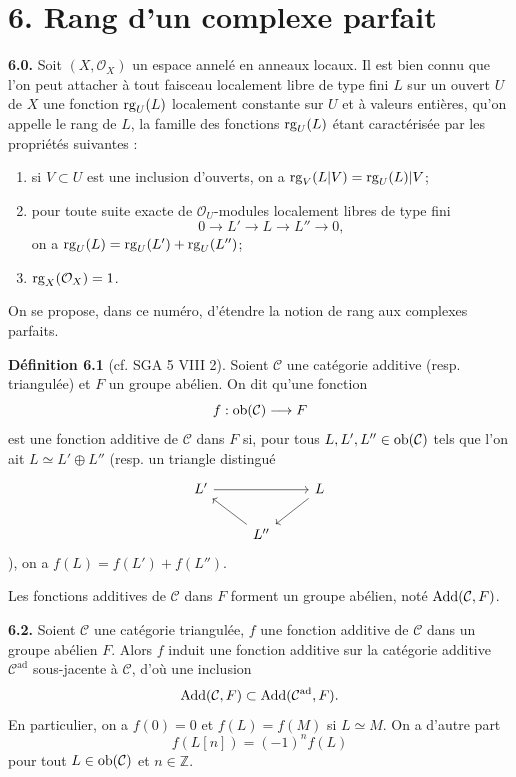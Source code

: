 \documentclass[11pt]{article}
\begin{document}
\section*{6. Rang d'un complexe parfait}

\textbf{6.0.} Soit \((X,\mathcal O_X)\) un espace annelé en anneaux locaux. Il est bien connu que l'on peut attacher à tout faisceau localement libre de type fini \(L\) sur un ouvert \(U\) de \(X\) une fonction \(\operatorname{rg}_U(L)\) localement constante sur \(U\) et à valeurs entières, qu'on appelle le rang de \(L\), la famille des fonctions \(\operatorname{rg}_U(L)\) étant caractérisée par les propriétés suivantes :
\begin{enumerate}[label=(\roman*)]
\item si \(V\subset U\) est une inclusion d'ouverts, on a \(\operatorname{rg}_V(L|V)=\operatorname{rg}_U(L)|V\);
\item pour toute suite exacte de \(\mathcal O_U\)-modules localement libres de type fini
\[
  0\longrightarrow L'\longrightarrow L\longrightarrow L''\longrightarrow 0,
\]
on a \(\operatorname{rg}_U(L)=\operatorname{rg}_U(L')+\operatorname{rg}_U(L'')\);
\item \(\operatorname{rg}_X(\mathcal O_X)=1\).
\end{enumerate}
On se propose, dans ce numéro, d'étendre la notion de rang aux complexes parfaits.

\textbf{Définition 6.1} (cf. SGA 5 VIII 2). Soient \(\mathcal C\) une catégorie additive (resp. triangulée) et \(F\) un groupe abélien. On dit qu'une fonction
\[
  f:\operatorname{ob}(\mathcal C)\longrightarrow F
\]
est une fonction additive de \(\mathcal C\) dans \(F\) si, pour tous \(L,L',L''\in\operatorname{ob}(\mathcal C)\) tels que l'on ait \(L\simeq L'\oplus L''\) (resp. un triangle distingué
\[
\begin{tikzcd}
L' \arrow[rr] && L \arrow[dl]\\
& L'' \arrow[ul] &
\end{tikzcd}
\]
), on a \(f(L)=f(L')+f(L'')\).

Les fonctions additives de \(\mathcal C\) dans \(F\) forment un groupe abélien, noté \(\operatorname{Add}(\mathcal C,F)\).

\textbf{6.2.} Soient \(\mathcal C\) une catégorie triangulée, \(f\) une fonction additive de \(\mathcal C\) dans un groupe abélien \(F\). Alors \(f\) induit une fonction additive sur la catégorie additive \(\mathcal C^{\mathrm{ad}}\) sous-jacente à \(\mathcal C\), d'où une inclusion
\[
  \operatorname{Add}(\mathcal C,F)\subset \operatorname{Add}(\mathcal C^{\mathrm{ad}},F).
\]
En particulier, on a \(f(0)=0\) et \(f(L)=f(M)\) si \(L\simeq M\). On a d'autre part
\[
  f(L[n])=(-1)^n f(L)
\]
pour tout \(L\in\operatorname{ob}(\mathcal C)\) et \(n\in\mathbb Z\).
\end{document}
